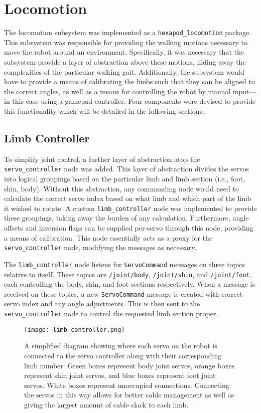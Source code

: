 \section{Locomotion}

The locomotion subsystem was implemented as a \texttt{hexapod\_locomotion} package. This subsystem was responsible for providing the walking motions necessary to move the robot around an environment. Specifically, it was necessary that the subsystem provide a layer of abstraction above these motions, hiding away the complexities of the particular walking gait. Additionally, the subsystem would have to provide a means of calibrating the limbs such that they can be aligned to the correct angles, as well as a means for controlling the robot by manual input---in this case using a gamepad controller. Four components were devised to provide this functionality which will be detailed in the following sections.

\subsection{Limb Controller}

To simplify joint control, a further layer of abstraction atop the \texttt{servo\_controller} node was added. This layer of abstraction divides the servos into logical groupings based on the particular limb and limb section (i.e., foot, shin, body). Without this abstraction, any commanding node would need to calculate the correct servo index based on what limb and which part of the limb it wished to rotate. A custom \texttt{limb\_controller} node was implemented to provide these groupings, taking away the burden of any calculation. Furthermore, angle offsets and inversion flags can be supplied per-servo through this node, providing a means of calibration. This node essentially acts as a proxy for the \texttt{servo\_controller} node, modifying the messages as necessary.

The \texttt{limb\_controller} node listens for \texttt{ServoCommand} messages on three topics relative to itself. These topics are \texttt{/joint/body}, \texttt{/joint/shin}, and \texttt{/joint/foot}, each controlling the body, shin, and foot sections respectively. When a message is received on these topics, a new \texttt{ServoCommand} message is created with correct servo index and any angle adjustments. This is then sent to the \texttt{servo\_controller} node to control the requested limb section proper.

\begin{figure}[!h]
    \centering
    \texttt{[image: limb\_controller.png]}
    \caption{A simplified diagram showing where each servo on the robot is connected to the servo controller along with their corresponding limb number. Green boxes represent body joint servos, orange boxes represent shin joint servos, and blue boxes represent foot joint servos. White boxes represent unoccupied connections. Connecting the servos in this way allows for better cable management as well as giving the largest amount of cable slack to each limb.}
    \label{fig:servo_pins}
\end{figure}

